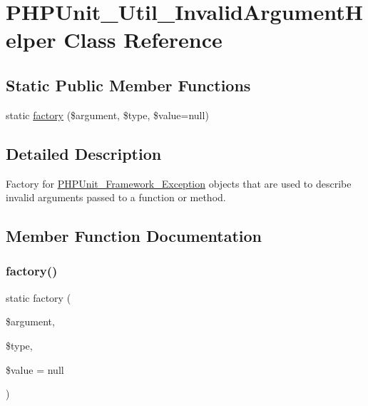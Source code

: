 \hypertarget{class_p_h_p_unit___util___invalid_argument_helper}{}\section{P\+H\+P\+Unit\+\_\+\+Util\+\_\+\+Invalid\+Argument\+Helper Class Reference}
\label{class_p_h_p_unit___util___invalid_argument_helper}
\subsection*{Static Public Member Functions}
\begin{DoxyCompactItemize}
\item 
static \mbox{\hyperlink{class_p_h_p_unit___util___invalid_argument_helper_abadba09fad8a35c20a80ff6ab95e500b}{factory}} (\$argument, \$type, \$value=null)
\end{DoxyCompactItemize}


\subsection{Detailed Description}
Factory for \mbox{\hyperlink{class_p_h_p_unit___framework___exception}{P\+H\+P\+Unit\+\_\+\+Framework\+\_\+\+Exception}} objects that are used to describe invalid arguments passed to a function or method. 

\subsection{Member Function Documentation}
\mbox{\label{class_p_h_p_unit___util___invalid_argument_helper_abadba09fad8a35c20a80ff6ab95e500b}} 
\subsubsection{\texorpdfstring{factory()}{factory()}}
{\footnotesize\ttfamily static factory (\begin{DoxyParamCaption}\item[{}]{\$argument,  }\item[{}]{\$type,  }\item[{}]{\$value = {\ttfamily null} }\end{DoxyParamCaption})\hspace{0.3cm}{\ttfamily [static]}}


